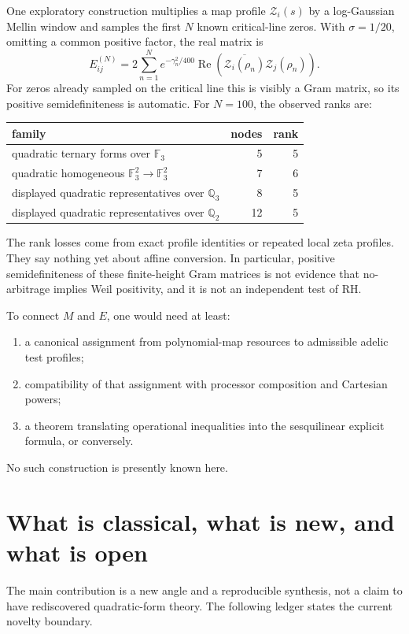 \documentclass[11pt]{article}
\theoremstyle{definition}
\theoremstyle{plain}
\theoremstyle{remark}
\newcommand{\F}{\mathbb F}
\newcommand{\Q}{\mathbb Q}
\begin{document}
One exploratory construction multiplies a map profile \(\mathcal Z_i(s)\) by
a log-Gaussian Mellin window and samples the first \(N\) known critical-line
zeros.  With \(\sigma=1/20\), omitting a common positive factor, the real
matrix is
\[
  E^{(N)}_{ij}
  =2\sum_{n=1}^N e^{-\gamma_n^2/400}
  \operatorname{Re}\!\left(
    \overline{\mathcal Z_i(\rho_n)}\mathcal Z_j(\rho_n)
  \right).
\]
For zeros already sampled on the critical line this is visibly a Gram matrix,
so its positive semidefiniteness is automatic.  For \(N=100\), the observed
ranks are:
\begin{center}
\begin{tabular}{@{}lrr@{}}
\toprule
family & nodes & rank\\
\midrule
quadratic ternary forms over \(\F_3\) & 5 & 5\\
quadratic homogeneous \(\F_3^2\to\F_3^2\) & 7 & 6\\
displayed quadratic representatives over \(\Q_3\) & 8 & 5\\
displayed quadratic representatives over \(\Q_2\) & 12 & 5\\
\bottomrule
\end{tabular}
\end{center}
The rank losses come from exact profile identities or repeated local zeta
profiles.  They say nothing yet about affine conversion.  In particular,
positive semidefiniteness of these finite-height Gram matrices is not evidence
that no-arbitrage implies Weil positivity, and it is not an independent test
of RH.

To connect \(M\) and \(E\), one would need at least:
\begin{enumerate}
  \item a canonical assignment from polynomial-map resources to admissible
  adelic test profiles;
  \item compatibility of that assignment with processor composition and
  Cartesian powers;
  \item a theorem translating operational inequalities into the
  sesquilinear explicit formula, or conversely.
\end{enumerate}
No such construction is presently known here.

\section{What is classical, what is new, and what is open}
\label{sec:novelty}

The main contribution is a new angle and a reproducible synthesis, not a claim
to have rediscovered quadratic-form theory.  The following ledger states the
current novelty boundary.
\end{document}
